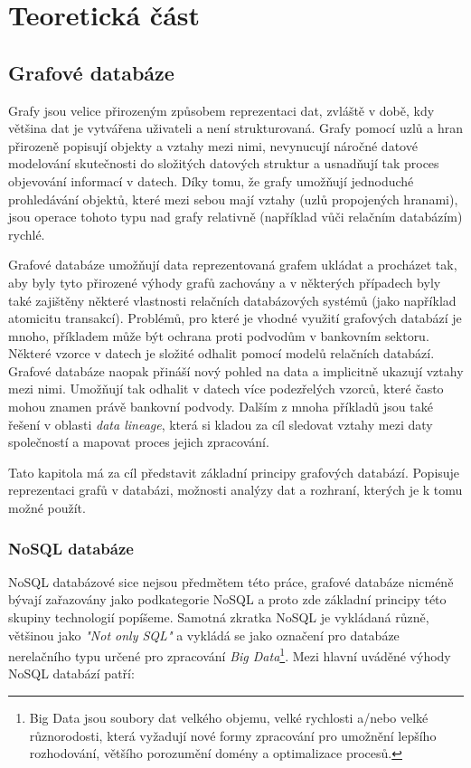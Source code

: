 \chapter{Teoretická část}

\section{Grafové databáze}
\label{sec:gdb}

Grafy jsou velice přirozeným způsobem reprezentaci dat, zvláště v době, kdy většina dat je vytvářena uživateli a není strukturovaná. Grafy pomocí uzlů a hran přirozeně popisují objekty a vztahy mezi nimi, nevynucují náročné datové modelování skutečnosti do složitých datových struktur a usnadňují tak proces objevování informací v datech. Díky tomu, že grafy umožňují jednoduché prohledávání objektů, které mezi sebou mají vztahy (uzlů propojených hranami), jsou operace tohoto typu nad grafy relativně (například vůči relačním databázím) rychlé.

Grafové databáze umožňují data reprezentovaná grafem ukládat a procházet tak, aby byly tyto přirozené výhody grafů zachovány a v některých případech byly také zajištěny některé vlastnosti relačních databázových systémů (jako například atomicitu transakcí). Problémů, pro které je vhodné využití grafových databází je mnoho, příkladem může být ochrana proti podvodům v bankovním sektoru. Některé vzorce v datech je složité odhalit pomocí modelů relačních databází. Grafové databáze naopak přináší nový pohled na data a implicitně ukazují vztahy mezi nimi. Umožňují tak odhalit v datech více podezřelých vzorců, které často mohou znamen právě bankovní podvody.\cite{Webber17} Dalším z mnoha příkladů jsou také řešení v oblasti \textit{data lineage}, která si kladou za cíl sledovat vztahy mezi daty společností a mapovat proces jejich zpracování.

Tato kapitola má za cíl představit základní principy grafových databází. Popisuje reprezentaci grafů v databázi, možnosti analýzy dat a rozhraní, kterých je k tomu možné použít.

\subsection{NoSQL databáze}
\label{sec:gdb-nosql}
NoSQL databázové sice nejsou předmětem této práce, grafové databáze nicméně bývají zařazovány jako podkategorie NoSQL a proto zde základní principy této skupiny technologií popíšeme. Samotná zkratka NoSQL je vykládaná různě, většinou jako \textit{"Not only SQL"} \cite{Evans09} a vykládá se jako označení pro databáze nerelačního typu určené pro zpracování \textit{Big Data}\footnote{Big Data jsou soubory dat velkého objemu, velké rychlosti a/nebo velké různorodosti, která vyžadují nové formy zpracování pro umožnění lepšího rozhodování, většího porozumění domény a optimalizace procesů.\cite{Laney01}}. Mezi hlavní uváděné výhody NoSQL databází patří:

